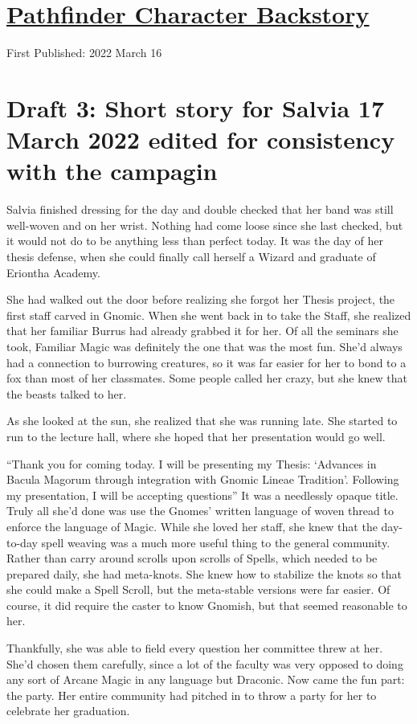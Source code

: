 \documentclass[12pt]{article}[titlepage]
\newcommand{\say}[1]{``#1''}
\newcommand{\nsay}[1]{`#1'}
\renewcommand{\,}{\textsuperscript{,}}
\begin{document}
\doublespacing
\section{\href{pathfinder-0-1.html}{Pathfinder Character Backstory}}
First Published: 2022 March 16

\section{Draft 3: Short story for Salvia 17 March 2022 edited for consistency with the campagin}
Salvia finished dressing for the day and double checked that her band was still well-woven and on her wrist.
Nothing had come loose since she last checked, but it would not do to be anything less than perfect today.
It was the day of her thesis defense, when she could finally call herself a Wizard and graduate of Eriontha Academy.

She had walked out the door before realizing she forgot her Thesis project, the first staff carved in Gnomic.
When she went back in to take the Staff, she realized that her familiar Burrus had already grabbed it for her.
Of all the seminars she took, Familiar Magic was definitely the one that was the most fun.
She'd always had a connection to burrowing creatures, so it was far easier for her to bond to a fox than most of her classmates.
Some people called her crazy, but she knew that the beasts talked to her.

As she looked at the sun, she realized that she was running late.
She started to run to the lecture hall, where she hoped that her presentation would go well.

\say{Thank you for coming today.
I will be presenting my Thesis: \nsay{Advances in Bacula Magorum through integration with Gnomic Lineae Tradition}.
Following my presentation, I will be accepting questions}
It was a needlessly opaque title.
Truly all she'd done was use the Gnomes' written language of woven thread to enforce the language of Magic.
While she loved her staff, she knew that the day-to-day spell weaving was a much more useful thing to the general community.
Rather than carry around scrolls upon scrolls of Spells, which needed to be prepared daily, she had meta-knots.
She knew how to stabilize the knots so that she could make a Spell Scroll, but the meta-stable versions were far easier.
Of course, it did require the caster to know Gnomish, but that seemed reasonable to her.

Thankfully, she was able to field every question her committee threw at her.
She'd chosen them carefully, since a lot of the faculty was very opposed to doing any sort of Arcane Magic in any language but Draconic.
Now came the fun part: the party.
Her entire community had pitched in to throw a party for her to celebrate her graduation.
\end{document}

